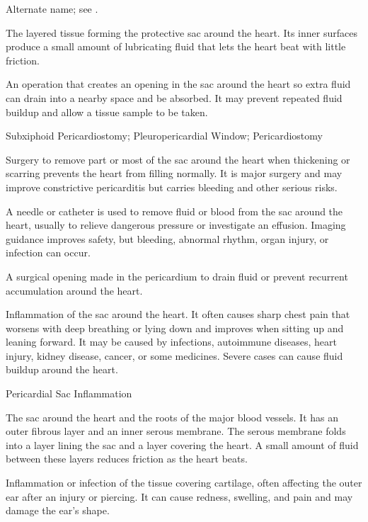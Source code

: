  Alternate name; see .

 The layered tissue forming the protective sac around the heart. Its inner surfaces produce a small amount of lubricating fluid that lets the heart beat with little friction.

 An operation that creates an opening in the sac around the heart so extra fluid can drain into a nearby space and be absorbed. It may prevent repeated fluid buildup and allow a tissue sample to be taken.

\synonyms
Subxiphoid Pericardiostomy; Pleuropericardial Window; Pericardiostomy

 Surgery to remove part or most of the sac around the heart when thickening or scarring prevents the heart from filling normally. It is major surgery and may improve constrictive pericarditis but carries bleeding and other serious risks.

 A needle or catheter is used to remove fluid or blood from the sac around the heart, usually to relieve dangerous pressure or investigate an effusion. Imaging guidance improves safety, but bleeding, abnormal rhythm, organ injury, or infection can occur.

 A surgical opening made in the pericardium to drain fluid or prevent recurrent accumulation around the heart.

 Inflammation of the sac around the heart. It often causes sharp chest pain that worsens with deep breathing or lying down and improves when sitting up and leaning forward. It may be caused by infections, autoimmune diseases, heart injury, kidney disease, cancer, or some medicines. Severe cases can cause fluid buildup around the heart.

\synonyms
Pericardial Sac Inflammation

 The sac around the heart and the roots of the major blood vessels. It has an outer fibrous layer and an inner serous membrane. The serous membrane folds into a layer lining the sac and a layer covering the heart. A small amount of fluid between these layers reduces friction as the heart beats.

 Inflammation or infection of the tissue covering cartilage, often affecting the outer ear after an injury or piercing. It can cause redness, swelling, and pain and may damage the ear's shape.

